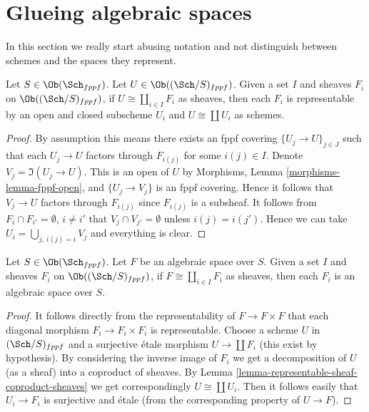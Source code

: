 \section{Glueing algebraic spaces}
\label{section-glueing-algebraic-spaces}

\noindent
In this section we really start abusing notation and not
distinguish between schemes and the spaces they represent.

\begin{lemma}
\label{lemma-representable-sheaf-coproduct-sheaves}
Let $S \in \Ob(\Sch_{fppf})$.
Let $U \in \Ob((\Sch/S)_{fppf})$.
Given a set $I$ and sheaves $F_i$ on $\Ob((\Sch/S)_{fppf})$,
if $U \cong \coprod_{i\in I} F_i$
as sheaves, then each $F_i$ is representable by an open and closed
subscheme $U_i$ and $U \cong \coprod U_i$ as schemes.
\end{lemma}

\begin{proof}
By assumption this means there exists an fppf covering
$\{U_j \to U\}_{j \in J}$ such that each $U_j \to U$
factors through $F_{i(j)}$ for some $i(j) \in I$.
Denote $V_j = \Im(U_j \to U)$.
This is an open of $U$ by
Morphisms, Lemma \ref{morphisms-lemma-fppf-open}, and
$\{U_j \to V_j\}$ is an fppf covering. Hence it follows that
$V_j \to U$ factors through $F_{i(j)}$ since $F_{i(j)}$ is
a subsheaf. It follows from $F_i \cap F_{i'} = \emptyset$, $i \not = i'$
that $V_j \cap V_{j'} = \emptyset$
unless $i(j) = i(j')$. Hence we can take
$U_i = \bigcup_{j, \ i(j) = i} V_j$ and everything is clear.
\end{proof}

\begin{lemma}
\label{lemma-algebraic-space-coproduct-sheaves}
Let $S \in \Ob(\Sch_{fppf})$.
Let $F$ be an algebraic space over $S$.
Given a set $I$ and sheaves $F_i$ on
$\Ob((\Sch/S)_{fppf})$,
if $F \cong \coprod_{i\in I} F_i$ as sheaves,
then each $F_i$ is an algebraic space over $S$.
\end{lemma}

\begin{proof}
It follows directly from the representability of
$F \to F \times F$ that each diagonal morphism
$F_i \to F_i \times F_i$ is representable.
Choose a scheme $U$ in $(\Sch/S)_{fppf}$ and a surjective
\'etale morphism $U \to \coprod F_i$ (this exist by hypothesis).
By considering the inverse image of $F_i$ we get a decomposition
of $U$ (as a sheaf) into a coproduct of sheaves.
By Lemma \ref{lemma-representable-sheaf-coproduct-sheaves}
we get correspondingly $U \cong \coprod U_i$.
Then it follows easily that $U_i \to F_i$ is surjective
and \'etale (from the corresponding property of $U \to F$).
\end{proof}

